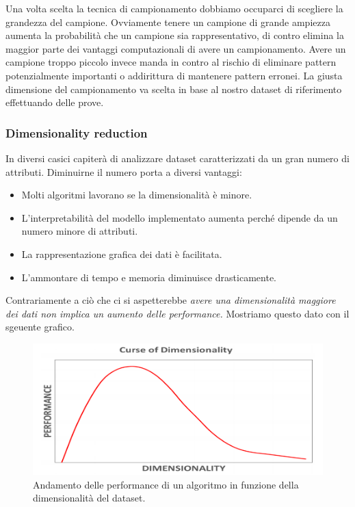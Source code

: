 Una volta scelta la tecnica di campionamento dobbiamo occuparci di scegliere la grandezza del campione. Ovviamente tenere un campione di grande ampiezza aumenta la probabilità che un campione sia rappresentativo, di contro elimina la maggior parte dei vantaggi computazionali di avere un campionamento. Avere un campione troppo piccolo invece manda in contro al rischio di eliminare pattern potenzialmente importanti o addirittura di mantenere pattern erronei. La giusta dimensione del campionamento va scelta in base al nostro dataset di riferimento effettuando delle prove.

\subsubsection{Dimensionality reduction}

In diversi casici capiterà di analizzare dataset caratterizzati da un gran numero di attributi. Diminuirne il numero porta a diversi vantaggi:

\begin{itemize}
	\item Molti algoritmi lavorano se la dimensionalità è minore.
	\item L'interpretabilità del modello implementato aumenta perché dipende da un numero minore di attributi.
	\item La rappresentazione grafica dei dati è facilitata.
	\item L'ammontare di tempo e memoria diminuisce drasticamente.
\end{itemize}

Contrariamente a ciò che ci si aspetterebbe \textit{avere una dimensionalità maggiore dei dati non implica un aumento delle performance.}
Mostriamo questo dato con il sgeuente grafico.

\begin{figure}[H]
	\centering
	\includegraphics[height=0.35 \linewidth]{introduction/pict/performance.png}
	\caption{Andamento delle performance di un algoritmo in funzione della dimensionalità del dataset.}
\end{figure}

